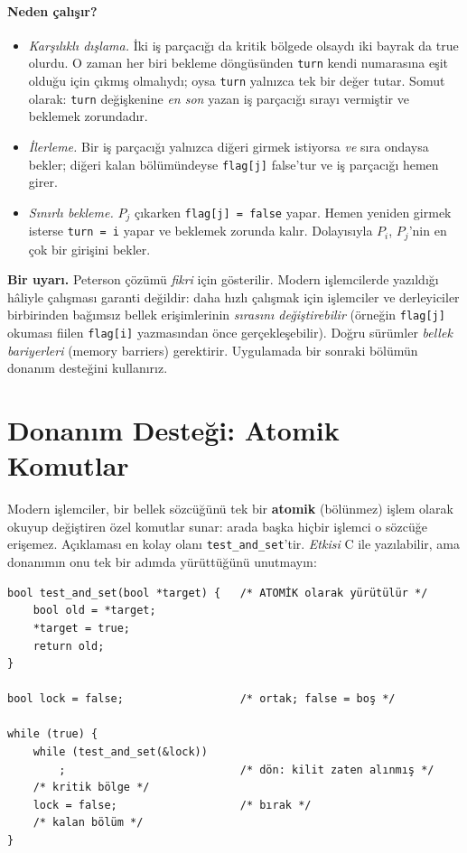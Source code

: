 \documentclass[11pt,a4paper]{article}
\newcommand{\term}[1]{\textbf{\color{mintdeep}#1}}
\begin{document}
\paragraph{Neden çalışır?}
\begin{itemize}
  \item \emph{Karşılıklı dışlama.} İki iş parçacığı da kritik bölgede olsaydı iki bayrak da true olurdu. O zaman her biri bekleme döngüsünden \texttt{turn} kendi numarasına eşit olduğu için çıkmış olmalıydı; oysa \texttt{turn} yalnızca tek bir değer tutar. Somut olarak: \texttt{turn} değişkenine \emph{en son} yazan iş parçacığı sırayı vermiştir ve beklemek zorundadır.
  \item \emph{İlerleme.} Bir iş parçacığı yalnızca diğeri girmek istiyorsa \emph{ve} sıra ondaysa bekler; diğeri kalan bölümündeyse \texttt{flag[j]} false'tur ve iş parçacığı hemen girer.
  \item \emph{Sınırlı bekleme.} $P_j$ çıkarken \texttt{flag[j] = false} yapar. Hemen yeniden girmek isterse \texttt{turn = i} yapar ve beklemek zorunda kalır. Dolayısıyla $P_i$, $P_j$'nin en çok bir girişini bekler.
\end{itemize}

\textbf{Bir uyarı.} Peterson çözümü \emph{fikri} için gösterilir. Modern işlemcilerde yazıldığı hâliyle çalışması garanti değildir: daha hızlı çalışmak için işlemciler ve derleyiciler birbirinden bağımsız bellek erişimlerinin \emph{sırasını değiştirebilir} (örneğin \texttt{flag[j]} okuması fiilen \texttt{flag[i]} yazmasından önce gerçekleşebilir). Doğru sürümler \emph{bellek bariyerleri} (memory barriers) gerektirir. Uygulamada bir sonraki bölümün donanım desteğini kullanırız.

\section{Donanım Desteği: Atomik Komutlar}

Modern işlemciler, bir bellek sözcüğünü tek bir \term{atomik} (bölünmez) işlem olarak okuyup değiştiren özel komutlar sunar: arada başka hiçbir işlemci o sözcüğe erişemez. Açıklaması en kolay olanı \texttt{test\_and\_set}'tir. \emph{Etkisi} C ile yazılabilir, ama donanımın onu tek bir adımda yürüttüğünü unutmayın:

\begin{lstlisting}
bool test_and_set(bool *target) {   /* ATOMİK olarak yürütülür */
    bool old = *target;
    *target = true;
    return old;
}

bool lock = false;                  /* ortak; false = boş */

while (true) {
    while (test_and_set(&lock))
        ;                           /* dön: kilit zaten alınmış */
    /* kritik bölge */
    lock = false;                   /* bırak */
    /* kalan bölüm */
}
\end{lstlisting}
\end{document}
